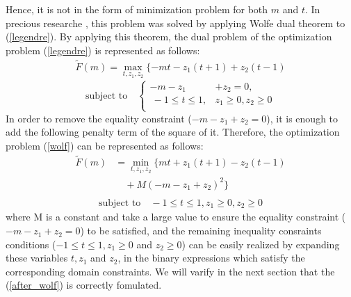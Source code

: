 \documentclass[fp,twocolumn]{jpsj3}
\begin{document}
Hence, it is not in the form of minimization problem for both $m$ and $t$.
In precious researche \cite{relu}, this problem was solved by applying Wolfe dual theorem to (\ref{legendre}). By applying this theorem, the dual problem of the optimization problem (\ref{legendre}) is represented as follows:
\begin{eqnarray}
  \widetilde{F}(m)=\max_{t,z_{1},z_{2}}{\{-mt-z_{1}(t+1)+z_{2}(t-1)} \label{wolf}
\end{eqnarray}
\begin{equation}
  \text{subject to} \quad \left\{
  \begin{aligned}
   -m-z_{1}&+z_{2}=0, \nonumber \\
   \ -1\leq t\leq 1,& z_{1}\geq 0, z_{2}\geq 0 \nonumber \\
  \end{aligned}
  \right.
\end{equation}
In order to remove the equality constraint ($-m-z_{1}+z_{2}=0$), it is enough to add the following penalty term of the square of it. Therefore, the optimization problem (\ref{wolf}) can be represented as follows:
\begin{equation}
  \begin{aligned}
    \widetilde{F}(m)&=\min_{t,z_{1},z_{2}}{\{mt+z_{1}(t+1)-z_{2}(t-1)} \\
    &\quad+M(-m-z_{1}+z_{2})^{2}\} \label{after_wolf} \\
  \end{aligned}
\end{equation}
\begin{eqnarray}
  \text{subject to} \quad -1\leq t\leq 1, z_{1}\geq 0, z_{2}\geq 0 \nonumber
\end{eqnarray}
where M is a constant and take a large value to ensure the equality constraint ($-m-z_{1}+z_{2}=0$) to be satisfied, and the remaining inequality consraints conditions ($-1\leq t\leq 1, z_{1}\geq 0$ and $z_{2}\geq 0$) can be easily realized by expanding these variables $t,z_{1}$ and $z_{2}$, in the binary expressions which satisfy the corresponding domain constraints. We will varify in the next section that the (\ref{after_wolf}) is correctly fomulated. 
\end{document}
